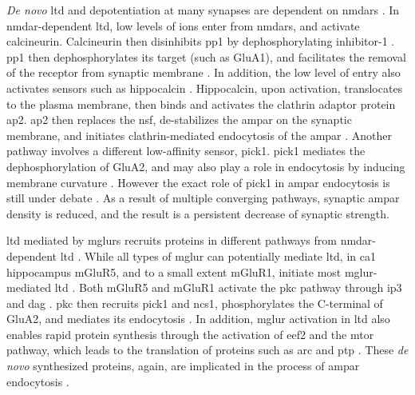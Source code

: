 \textit{De novo} \gls{ltd} and depotentiation at many synapses are dependent on \glspl{nmdar} \citep{collingridge83, dudek92}. In \gls{nmdar}-dependent \gls{ltd}, low levels of  ions enter from \glspl{nmdar}, and activate calcineurin. Calcineurin then disinhibits \gls{pp1} by dephosphorylating inhibitor-1 \citep{mulkey93}. \Gls{pp1} then dephosphorylates its target (such as GluA1), and facilitates the removal of the receptor from synaptic membrane \citep{collingridge04}. In addition, the low level of  entry also activates  sensors such as hippocalcin \citep{palmer05}. Hippocalcin, upon activation, translocates to the plasma membrane, then binds and activates the clathrin adaptor protein \gls{ap2}. \Gls{ap2} then replaces the \gls{nsf}, de-stabilizes the \gls{ampar} on the synaptic membrane, and initiates clathrin-mediated endocytosis of the \gls{ampar} \citep{collingridge04, palmer05}. Another pathway involves a different low-affinity  sensor, \gls{pick1}. \Gls{pick1} mediates the dephosphorylation of GluA2, and may also play a role in endocytosis by inducing membrane curvature \citep{collingridge04, lin07}. However the exact role of \gls{pick1} in \gls{ampar} endocytosis is still under debate \citep{collingridge10}. As a result of multiple converging pathways, synaptic \gls{ampar} density is reduced, and the result is a persistent decrease of synaptic strength.

\Gls{ltd} mediated by \glspl{mglur} recruits proteins in different pathways from \gls{nmdar}-dependent \gls{ltd} \citep{gladding09}. While all types of \gls{mglur} can potentially mediate \gls{ltd}, in \gls{ca1} hippocampus mGluR5, and to a small extent mGluR1, initiate most \gls{mglur}-mediated \gls{ltd} \citep{luscher10}. Both mGluR5 and mGluR1 activate the \gls{pkc} pathway through \gls{ip3} and \gls{dag} \citep{oliet97}. \Gls{pkc} then recruits \gls{pick1} and \gls{ncs1}, phosphorylates the C-terminal of GluA2, and mediates its endocytosis \citep{bellone06, jo08}. In addition, \gls{mglur} activation in \gls{ltd} also enables rapid protein synthesis through the activation of \gls{eef2} and the \gls{mtor} pathway, which leads to the translation of proteins such as \gls{arc} and \gls{ptp} \citep{park08, zhang08}. These \textit{de novo} synthesized proteins, again, are implicated in the process of \gls{ampar} endocytosis \citep{collingridge10}.

